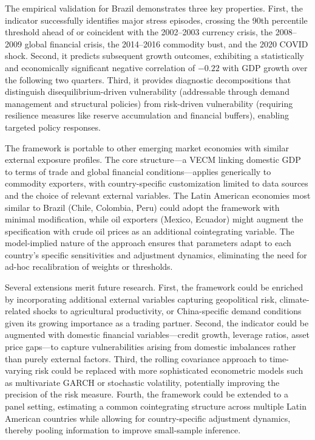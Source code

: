 \documentclass[12pt,a4paper]{article}
\numberwithin{equation}{section}
\theoremstyle{definition}
\theoremstyle{remark}
\begin{document}
The empirical validation for Brazil demonstrates three key properties. First, the indicator successfully identifies major stress episodes, crossing the 90th percentile threshold ahead of or coincident with the 2002--2003 currency crisis, the 2008--2009 global financial crisis, the 2014--2016 commodity bust, and the 2020 COVID shock. Second, it predicts subsequent growth outcomes, exhibiting a statistically and economically significant negative correlation of $-0.22$ with GDP growth over the following two quarters. Third, it provides diagnostic decompositions that distinguish disequilibrium-driven vulnerability (addressable through demand management and structural policies) from risk-driven vulnerability (requiring resilience measures like reserve accumulation and financial buffers), enabling targeted policy responses.

The framework is portable to other emerging market economies with similar external exposure profiles. The core structure---a VECM linking domestic GDP to terms of trade and global financial conditions---applies generically to commodity exporters, with country-specific customization limited to data sources and the choice of relevant external variables. The Latin American economies most similar to Brazil (Chile, Colombia, Peru) could adopt the framework with minimal modification, while oil exporters (Mexico, Ecuador) might augment the specification with crude oil prices as an additional cointegrating variable. The model-implied nature of the approach ensures that parameters adapt to each country's specific sensitivities and adjustment dynamics, eliminating the need for ad-hoc recalibration of weights or thresholds.

Several extensions merit future research. First, the framework could be enriched by incorporating additional external variables capturing geopolitical risk, climate-related shocks to agricultural productivity, or China-specific demand conditions given its growing importance as a trading partner. Second, the indicator could be augmented with domestic financial variables---credit growth, leverage ratios, asset price gaps---to capture vulnerabilities arising from domestic imbalances rather than purely external factors. Third, the rolling covariance approach to time-varying risk could be replaced with more sophisticated econometric models such as multivariate GARCH or stochastic volatility, potentially improving the precision of the risk measure. Fourth, the framework could be extended to a panel setting, estimating a common cointegrating structure across multiple Latin American countries while allowing for country-specific adjustment dynamics, thereby pooling information to improve small-sample inference.
\end{document}
